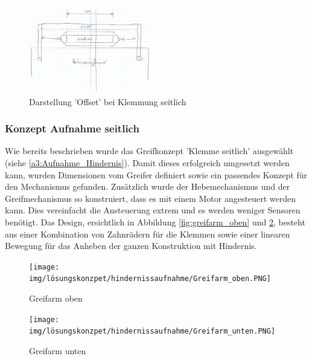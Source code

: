 \documentclass[../main.tex]{subfiles}
\begin{document}
        \begin{figure}[h!]
            \centering
            \includegraphics[width=0.48\textwidth]{img/konzeptfindung/Klemme_Langsweg_off_center.png}
            \caption{Darstellung 'Offset' bei Klemmung seitlich}
        \label{img:konzept_zentrierung_3}
        \end{figure}  

\newpage

\subsubsection{Konzept Aufnahme seitlich}
\label{a3:Aufnahme_seitlich}
Wie bereits beschrieben wurde das Greifkonzept 'Klemme seitlich' ausgewählt (siehe \ref{a3:Aufnahme_Hindernis}).
Damit dieses erfolgreich umgesetzt werden kann, wurden Dimensionen vom Greifer definiert  sowie ein passendes Konzept für den Mechanismus gefunden. Zusätzlich wurde der Hebemechanismus und der Greifmechanismus so konstruiert, dass es mit einem Motor angesteuert werden kann. Dies vereinfacht die Ansteuerung extrem und es werden weniger Sensoren benötigt.
Das Design, ersichtlich in Abbildung \ref{fig:greifarm_oben} und \ref{fig:greifarm_unten}, besteht aus einer Kombination von Zahnrädern für die Klemmen sowie einer linearen Bewegung für das Anheben der ganzen Konstruktion mit Hindernis.

\begin{figure}[h!]
    \centering
    \begin{minipage}[t]{0.45\textwidth}
        \centering
        \texttt{[image: img/lösungskonzpet/hindernissaufnahme/Greifarm\_oben.PNG]}
        \caption{Greifarm oben}
        \label{fig:greifarm_oben}
    \end{minipage}
    \hfill
    \begin{minipage}[t]{0.45\textwidth}
        \centering
        \texttt{[image: img/lösungskonzpet/hindernissaufnahme/Greifarm\_unten.PNG]}
        \caption{Greifarm unten}
        \label{fig:greifarm_unten}
    \end{minipage}
\end{figure}
\end{document}
